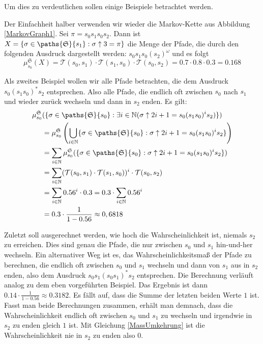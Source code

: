Um dies zu verdeutlichen sollen einige Beispiele betrachtet werden.
\begin{example}[Wahrscheinlichkeitsmaße]
	Der Einfachheit halber verwenden wir wieder die Markov-Kette aus Abbildung \ref{MarkovGraph1}. Sei $\pi=s_0s_1s_0s_2$. 
	Dann ist $X=\{\sigma \in \paths{\mathfrak{S}}{s_1} : \sigma\uparrow 3 = \pi\}$ die Menge der Pfade, die durch den folgenden Ausdruck dargestellt werden: $s_0s_1s_0(s_2)^\omega$ und es folgt
	$$\mu^\mathfrak{S}_{s_0}(X)=\mathcal{T}(s_0,s_1) \cdot \mathcal{T}(s_1,s_0) \cdot \mathcal{T}(s_0,s_2) = 0.7 \cdot 0.8 \cdot 0.3 = 0.168$$
	
	Als zweites Beispiel wollen wir alle Pfade betrachten, die dem Ausdruck $s_0(s_1s_0)^\ast s_2$ entsprechen. Also alle Pfade, die endlich oft zwischen $s_0$ nach $s_1$ und wieder zurück wechseln und dann in $s_2$ enden. Es gilt:
	\begin{align*}
		\mu^\mathfrak{S}_{s_0}&(\{\sigma\in \paths{\mathfrak{S}}{s_0} : \exists i\in \mathbb{N} (\sigma\uparrow 2i+1 = s_0(s_1s_0)^i s_2)\}) \\
		&=\mu^\mathfrak{S}_{s_0} \left(\bigcup_{i\in \mathbb{N}} \{\sigma\in \paths{\mathfrak{S}}{s_0} : \sigma\uparrow 2i+1 = s_0(s_1s_0)^i s_2\}\right) \\
		&=\sum_{i\in \mathbb{N}} \mu^\mathfrak{S}_{s_0}(\{\sigma\in \paths{\mathfrak{S}}{s_0} : \sigma\uparrow 2i+1 = s_0(s_1s_0)^i s_2\}) \\
		&=\sum_{i\in \mathbb{N}} (\mathcal{T}(s_0, s_1) \cdot \mathcal{T}(s_1, s_0))^i \cdot \mathcal{T}(s_0,s_2) \\
		&=\sum_{i\in \mathbb{N}} 0.56^i \cdot 0.3 = 0.3 \cdot \sum_{i\in \mathbb{N}} 0.56^i \\
		&= 0.3 \cdot \frac{1}{1-0.56} \approx 0,6818
	\end{align*}
	
	Zuletzt soll ausgerechnet werden, wie hoch die Wahrscheinlichkeit ist, niemals $s_2$ zu erreichen. 
	Dies sind genau die Pfade, die nur zwischen $s_0$ und $s_1$ hin-und-her wechseln. 
	Ein alternativer Weg ist es, das Wahrscheinlichkeitsmaß der Pfade zu berechnen, die endlich oft zwischen $s_0$ und $s_1$ wechseln und dann von $s_1$ aus in $s_2$ enden, also dem Ausdruck $s_0s_1(s_0s_1)^\ast s_2$ entsprechen. 
	Die Berechnung verläuft analog zu dem eben vorgeführten Beispiel. 
	Das Ergebnis ist dann $0.14\cdot\frac{1}{1-0.56} \approx 0.3182$. Es fällt auf, dass die Summe der letzten beiden Werte $1$ ist. 
	Fasst man beide Berechnungen zusammen, erhält man demnach, dass die Wahrscheinlichkeit endlich oft zwischen $s_0$ und $s_1$ zu wechseln und irgendwie in $s_2$ zu enden gleich $1$ ist. Mit Gleichung \ref{MassUmkehrung} ist die Wahrscheinlichkeit nie in $s_2$ zu enden also $0$.
\end{example}

